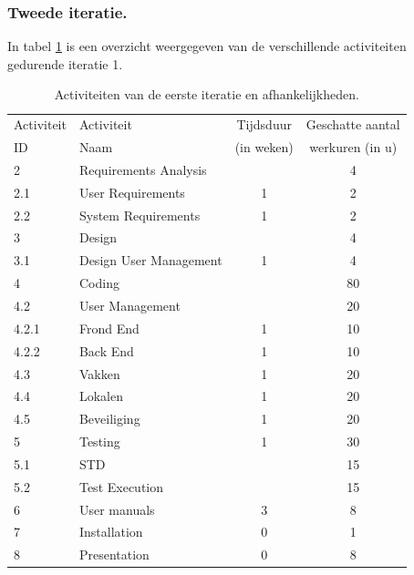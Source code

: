 \subsubsection{Tweede iteratie.}
In tabel \ref{tab:ActivityDependenciesIteratie2} is een overzicht weergegeven van de verschillende activiteiten gedurende iteratie 1.
\begin{table} [H]
	\centering
	\caption{Activiteiten van de eerste iteratie en afhankelijkheden.}
	\begin{tabular} {l|l|c|c}
		Activiteit & Activiteit & Tijdsduur & Geschatte aantal  \\
		ID & Naam & (in weken) & werkuren (in u) \\
		\hline
		2 	& Requirements Analysis 		&   & 4   	\\
		2.1 & User Requirements 			& 1 & 2  	\\
		2.2 & System Requirements 		& 1 & 2  	\\
		\hline
		3 	& Design 					&   & 4 	\\
		3.1 & Design User Management 	& 1 & 4 	\\
		\hline
		4 	& Coding 					&   & 80 	\\
		4.2 & User Management			&   & 20   	\\
		4.2.1 & Frond End 		 		& 1 & 10  	\\
		4.2.2 & Back End					& 1 & 10 	\\
		4.3 & Vakken 					& 1	& 20		\\
		4.4 & Lokalen					& 1	& 20		\\
		4.5 & Beveiliging				& 1	& 20		\\
		\hline
		5 	& Testing 					& 1 & 30  	\\
		5.1 & STD						&   & 15  	\\
		5.2 & Test Execution				&   & 15  	\\
		\hline
		6 	& User manuals 				& 3 & 8  	\\
		\hline
		7 	& Installation 				& 0 & 1  	\\
		\hline
		8 	& Presentation 				& 0 & 8 		\\
	\end{tabular}
	\label{tab:ActivityDependenciesIteratie2}
\end{table}

